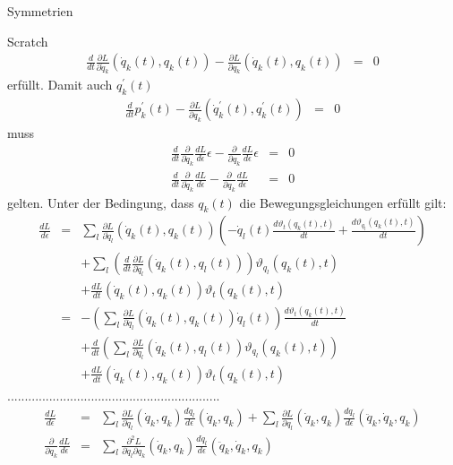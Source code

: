 \documentclass[a4paper,fleqn]{article}
\numberwithin{equation}{section}
\begin{document}
\begin{section}{Symmetrien}
\begin{subsection}{Scratch}
\begin{eqnarray*}
\frac{d}{dt}\frac{\partial L}{\partial \dot{q}_k}\left(\dot{q}_k(t),q_k(t)\right)-\frac{\partial L}{\partial q_k}\left(\dot{q}_k(t),q_k(t)\right) &=& 0
\end{eqnarray*}
erfüllt. Damit auch $q^\prime_k(t)$
\begin{eqnarray*}
\frac{d}{dt}p^\prime_k(t)-\frac{\partial L}{\partial q_k}(\dot{q}^\prime_k(t),q^\prime_k(t)) &=& 0
\end{eqnarray*}
muss
\begin{eqnarray*}
\frac{d}{dt}\frac{\partial}{\partial \dot{q}_k}\frac{dL}{d\epsilon}\epsilon-\frac{\partial}{\partial q_k}\frac{dL}{d\epsilon}\epsilon &=&0\\
\frac{d}{dt}\frac{\partial}{\partial \dot{q}_k}\frac{dL}{d\epsilon}-\frac{\partial}{\partial q_k}\frac{dL}{d\epsilon} &=&0
\end{eqnarray*}
gelten. Unter der Bedingung, dass $q_k(t)$ die Bewegungsgleichungen erfüllt gilt:
\begin{eqnarray*}
\frac{dL}{d\epsilon}&=&\sum_l\frac{\partial L}{\partial \dot{q}_l}\left(\dot{q}_k(t),q_k(t)\right)\left(-\dot{q}_l(t)\frac{d\vartheta_t(q_k(t),t)}{dt}
+\frac{d\vartheta_{q_l}(q_k(t),t)}{dt}\right)\\
&&+\sum_l\left(\frac{d}{dt}\frac{\partial L}{\partial \dot{q}_l}\left(\dot{q}_k(t),q_l(t)\right)\right)\vartheta_{q_l}(q_k(t),t)\\
&&+\frac{dL}{dt}\left(\dot{q}_k(t),q_k(t)\right)\vartheta_t(q_k(t),t)\\
&=&-\left(\sum_l\frac{\partial L}{\partial \dot{q}_l}\left(\dot{q}_k(t),q_k(t)\right)\dot{q}_l(t)\right)\frac{d\vartheta_t(q_k(t),t)}{dt}\\
&&+\frac{d}{dt}\left(\sum_l\frac{\partial L}{\partial \dot{q}_l}\left(\dot{q}_k(t),q_l(t)\right)\vartheta_{q_l}(q_k(t),t)\right)\\
&&+\frac{dL}{dt}\left(\dot{q}_k(t),q_k(t)\right)\vartheta_t(q_k(t),t)
\end{eqnarray*}
.............................................................
\begin{eqnarray*}
\frac{dL}{d\epsilon}&=&\sum_l\frac{\partial L}{\partial \dot{q}_l}(\dot{q}_k,q_k)\frac{d\dot{q}_l}{d\epsilon}(\dot{q}_k,q_k)
+\sum_l\frac{\partial L}{\partial q_l}(\dot{q}_k,q_k)\frac{dq_l}{d\epsilon}(\ddot{q}_k,\dot{q}_k,q_k)\\
\frac{\partial}{\partial q_k}\frac{dL}{d\epsilon}&=&\sum_l\frac{\partial^2 L}{\partial \dot{q}_l\partial q_k}(\dot{q}_k,q_k)\frac{d\dot{q}_l}{d\epsilon}(\ddot{q}_k,\dot{q}_k,q_k)

\end{eqnarray*}
\end{subsection}
\end{section}
\end{document}
